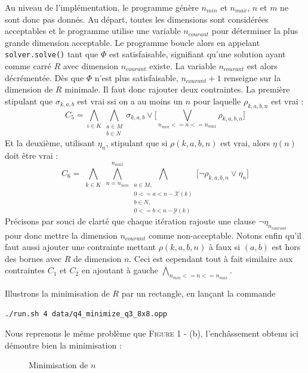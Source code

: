 \documentclass[a4paper]{article}
\begin{document}
Au niveau de l'implémentation, le programme génère $n_{min}$ et $n_{max}$, $n$ et $m$ ne sont donc pas donnés. Au départ, toutes les dimensions sont considérées acceptables et le programme utilise une variable $n_{courant}$ pour déterminer la plus grande dimension acceptable. Le programme boucle alors en appelant \texttt{solver.solve()} tant que $\Phi$ est satisfaisable, signifiant qu'une solution ayant comme carré $R$ avec dimension $n_{courant}$ existe. La variable $n_{courant}$ est alors décrémentée. Dès que $\Phi$ n'est plus satisfaisable, $n_{courant} + 1$ renseigne sur la dimension de $R$ minimale.
Il faut donc rajouter deux contraintes. La première stipulant que $\sigma_{k,a,b}$ est vrai ssi on a au moins un $n$ pour laquelle $\rho_{k,a,b,n}$ est vrai :
\begin{equation*}
C_5 = \bigwedge\limits_{i\in K} \bigwedge\limits_{\substack{a \in M \\ b \in N}} \sigma_{k,a,b} \lor \bigg[ \bigvee\limits_{n_{min} <= n <= n_{max}} \rho_{k,a,b,n} \bigg]
\end{equation*}
Et la deuxième, utilisant $\eta_n$, stipulant que si $\rho(k,a,b,n)$ est vrai, alors $\eta(n)$ doit être vrai :
\begin{equation*}
C_6 = 	\bigwedge\limits_{\substack{k\in K}}
			\bigwedge\limits_{n = n_{min}}^{n_{max}}
				\bigwedge\limits_{\substack{a \in M, \\ 0 <= a < n - \mathcal{X}(k) \\ b \in N, \\ 0 <= b < n - \mathcal{Y}(k)}}
					\big[
						\lnot \rho_{k,a,b,n} \lor \eta_n
					\big]
\end{equation*}
Précisons par souci de clarté que chaque itération rajoute une clause $\lnot \eta_{n_{courant}}$ pour donc mettre la dimension $n_{courant}$ comme non-acceptable. 
Notons enfin qu'il faut aussi ajouter une contrainte mettant $\rho(k,a,b,n)$ à faux si $(a,b)$ est hors des bornes avec $R$ de dimension $n$. Ceci est cependant tout à fait similaire aux contraintes $C_1$ et $C_2$ en ajoutant à gauche $\bigwedge\limits_{n_{min} <= n <= n_{max}}$.

Illustrons la minimisation de $R$ par un rectangle, en lançant la commande 
\begin{center}
\texttt{./run.sh 4 data/q4\_minimize\_q3\_8x8.opp}
\end{center}
Nous reprenons le même problème que \textsc{Figure 1} - (b), l'enchâssement obtenu ici démontre bien la minimisation :
\begin{figure}[H]
  \centering
  \caption{Minimisation de $n$}
\end{figure}
\end{document}
